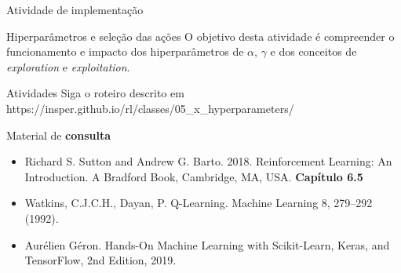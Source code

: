 \documentclass{beamer}
\begin{document}
\begin{frame}{Atividade de implementação}
		
	\begin{alertblock}{Hiperparâmetros e seleção das ações}
		O objetivo desta atividade é compreender o funcionamento e impacto dos hiperparâmetros de $\alpha$, $\gamma$ e dos conceitos de \textit{exploration} e \textit{exploitation}.
	\end{alertblock}
	
	\begin{block}{Atividades}
		Siga o roteiro descrito em https://insper.github.io/rl/classes/05\_x\_hyperparameters/ \href{https://insper.github.io/rl/classes/05_x_hyperparameters/}
		{}
	\end{block}

\end{frame}

\begin{frame}{Material de \textbf{consulta}}
	\begin{itemize}
		\item Richard S. Sutton and Andrew G. Barto. 2018. Reinforcement Learning: An Introduction. A Bradford Book, Cambridge, MA, USA. \textbf{Capítulo 6.5}
		\item Watkins, C.J.C.H., Dayan, P. Q-Learning. Machine Learning 8, 279–292 (1992). \href{https://doi.org/10.1007/BF00992698}{}
		\item Aurélien Géron. Hands-On Machine Learning with Scikit-Learn, Keras, and TensorFlow, 2nd Edition, 2019. 
	\end{itemize}
\end{frame}
\end{document}
